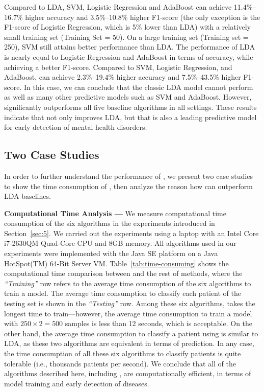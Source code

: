 
Compared to LDA, SVM, Logistic Regression and AdaBoost can achieve 11.4\%--16.7\% higher accuracy and 3.5\%--10.8\% higher F1-score (the only exception is the F1-score of Logistic Regression, which is 5\% lower than LDA) with a relatively small training set (Training Set = 50). 
On a large training set (Training set = 250), SVM still attains better performance than LDA.
The performance of LDA is nearly equal to Logistic Regression and AdaBoost in terms of accuracy, while achieving a better F1-score.
Compared to SVM, Logistic Regression, and AdaBoost, \TheName{} can achieve 2.3\%--19.4\% higher accuracy and 7.5\%--43.5\% higher F1-score. 
In this case, we can conclude that the classic LDA model cannot perform as well as many other predictive models such as SVM and AdaBoost. However, \TheName{} significantly outperforms all five baseline algorithms in all settings. 
These results indicate that \TheName{} not only improves LDA, but that \TheName{} is also a leading predictive model for early detection of mental health disorders. 



\subsection{Two Case Studies}
In order to further understand the performance of \TheName{}, we present two case studies to show the time consumption of \TheName{}, then analyze the reason how \TheName{} can outperform LDA baselines.

\textbf{Computational Time Analysis --- } We measure computational time consumption of the six algorithms in the experiments introduced in Section~\ref{sec:5}. We carried out the experiments using a laptop with an Intel Core i7-2630QM Quad-Core CPU and 8GB memory. All algorithms used in our experiments were implemented with the Java SE platform on a Java HotSpot(TM) 64-Bit Server VM. Table~\ref{tab:time-consuming} shows the computational time comparison between \TheName{} and the rest of methods, where the \emph{``Training''} row refers to the average time consumption of the six algorithms to train a model.  
The average time consumption to classify each patient of the testing set is shown in the \emph{``Testing''} row. 
Among these six algorithms, \TheName{} takes the longest time to train---however, the average time consumption to train a model with $250\times 2=500$ samples is less than 12 seconds, which is acceptable. 
On the other hand, the average time consumption to classify a patient using \TheName{} is similar to LDA, as these two algorithms are equivalent in terms of prediction. 
In any case, the time consumption of all these six algorithms to classify patients is quite tolerable (i.e., thousands patients per second). 
We conclude that all of the algorithms described here, including \TheName{}, are computationally efficient, in terms of model training and early detection of diseases.

